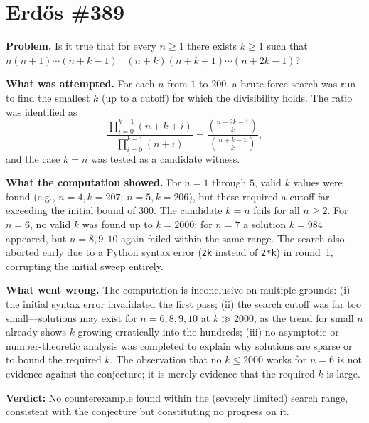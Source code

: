 \section{Erdős \#389}

\textbf{Problem.} Is it true that for every $n \geq 1$ there exists $k \geq 1$ such that
$n(n+1)\cdots(n+k-1) \mid (n+k)(n+k+1)\cdots(n+2k-1)$?

\textbf{What was attempted.} For each $n$ from $1$ to $200$, a brute-force search was run to find the smallest $k$ (up to a cutoff) for which the divisibility holds. The ratio was identified as
\[
\frac{\prod_{i=0}^{k-1}(n+k+i)}{\prod_{i=0}^{k-1}(n+i)} = \frac{\binom{n+2k-1}{k}}{\binom{n+k-1}{k}},
\]
and the case $k = n$ was tested as a candidate witness.

\textbf{What the computation showed.} For $n = 1$ through $5$, valid $k$ values were found (e.g., $n=4, k=207$; $n=5, k=206$), but these required a cutoff far exceeding the initial bound of $300$. The candidate $k = n$ fails for all $n \geq 2$. For $n = 6$, no valid $k$ was found up to $k = 2000$; for $n = 7$ a solution $k = 984$ appeared, but $n = 8, 9, 10$ again failed within the same range. The search also aborted early due to a Python syntax error (\texttt{2k} instead of \texttt{2*k}) in round~1, corrupting the initial sweep entirely.

\textbf{What went wrong.} The computation is inconclusive on multiple grounds: (i) the initial syntax error invalidated the first pass; (ii) the search cutoff was far too small---solutions may exist for $n = 6, 8, 9, 10$ at $k \gg 2000$, as the trend for small $n$ already shows $k$ growing erratically into the hundreds; (iii) no asymptotic or number-theoretic analysis was completed to explain why solutions are sparse or to bound the required $k$. The observation that no $k \leq 2000$ works for $n = 6$ is not evidence against the conjecture; it is merely evidence that the required $k$ is large.

\textbf{Verdict:} No counterexample found within the (severely limited) search range, consistent with the conjecture but constituting no progress on it.